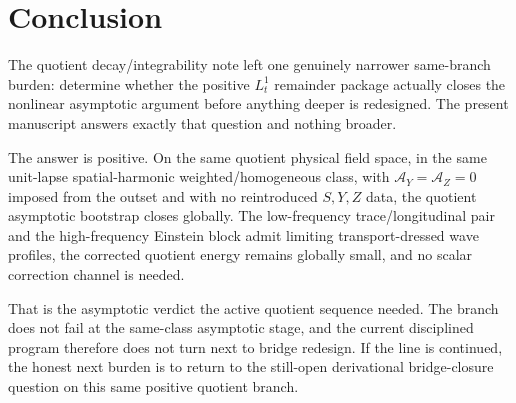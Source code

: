 \documentclass[11pt]{article}
\newcommand{\AY}{\mathcal A_Y}
\newcommand{\AZ}{\mathcal A_Z}
\begin{document}
\section{Conclusion}

The quotient decay/integrability note left one genuinely narrower same-branch burden: determine whether the positive \(L_t^1\) remainder package actually closes the nonlinear asymptotic argument before anything deeper is redesigned. The present manuscript answers exactly that question and nothing broader.

The answer is positive. On the same quotient physical field space, in the same unit-lapse spatial-harmonic weighted/homogeneous class, with \(\AY=\AZ=0\) imposed from the outset and with no reintroduced \(S,Y,Z\) data, the quotient asymptotic bootstrap closes globally. The low-frequency trace/longitudinal pair and the high-frequency Einstein block admit limiting transport-dressed wave profiles, the corrected quotient energy remains globally small, and no scalar correction channel is needed.

That is the asymptotic verdict the active quotient sequence needed. The branch does not fail at the same-class asymptotic stage, and the current disciplined program therefore does not turn next to bridge redesign. If the line is continued, the honest next burden is to return to the still-open derivational bridge-closure question on this same positive quotient branch.
\end{document}
